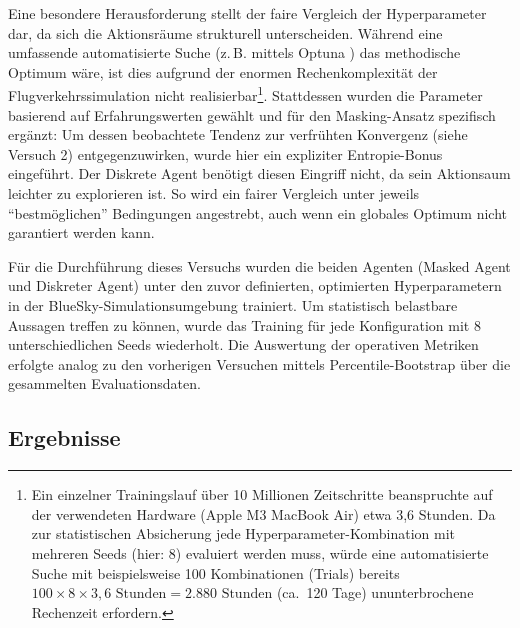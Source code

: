 Eine besondere Herausforderung stellt der faire Vergleich der Hyperparameter dar, da sich die Aktionsräume strukturell unterscheiden. Während eine umfassende automatisierte Suche (z.\,B. mittels Optuna \cite{Optuna}) das methodische Optimum wäre, ist dies aufgrund der enormen Rechenkomplexität der Flugverkehrssimulation nicht realisierbar\footnote{Ein einzelner Trainingslauf über 10 Millionen Zeitschritte beanspruchte auf der verwendeten Hardware (Apple M3 MacBook Air) etwa 3,6 Stunden. Da zur statistischen Absicherung jede Hyperparameter-Kombination mit mehreren Seeds (hier: 8) evaluiert werden muss, würde eine automatisierte Suche mit beispielsweise 100 Kombinationen (Trials) bereits $100 \times 8 \times 3,6\text{ Stunden} = 2.880\text{ Stunden}$ (ca.~120 Tage) ununterbrochene Rechenzeit erfordern.}. Stattdessen wurden die Parameter basierend auf Erfahrungswerten gewählt und für den Masking-Ansatz spezifisch ergänzt: Um dessen beobachtete Tendenz zur verfrühten Konvergenz (siehe Versuch 2) entgegenzuwirken, wurde hier ein expliziter Entropie-Bonus eingeführt. Der Diskrete Agent benötigt diesen Eingriff nicht, da sein Aktionsaum leichter zu explorieren ist. So wird ein fairer Vergleich unter jeweils \enquote{bestmöglichen} Bedingungen angestrebt, auch wenn ein globales Optimum nicht garantiert werden kann.
\medskip

Für die Durchführung dieses Versuchs wurden die beiden Agenten (Masked Agent und Diskreter Agent) unter den zuvor definierten, optimierten Hyperparametern in der BlueSky-Simulationsumgebung trainiert. Um statistisch belastbare Aussagen treffen zu können, wurde das Training für jede Konfiguration mit 8 unterschiedlichen Seeds wiederholt. Die Auswertung der operativen Metriken erfolgte analog zu den vorherigen Versuchen mittels Percentile-Bootstrap über die gesammelten Evaluationsdaten.

\subsection{Ergebnisse}

